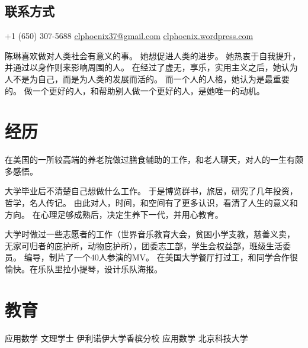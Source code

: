 \documentclass[]{friggeri-cv}
\begin{document}


\begin{aside} %
  \section{联系方式}
  +1 (650) 307-5688
  \href{mailto:clphoenix37+cv@gmail.com}{clphoenix37@gmail.com}
  \href{https://clphoenix.wordpress.com/}{clphoenix.wordpress.com}
\end{aside}

陈琳喜欢做对人类社会有意义的事。
她想促进人类的进步。
她热衷于自我提升，并通过以身作则来影响周围的人。
在经过了虚无，享乐，实用主义之后，她认为人不是为自己，而是为人类的发展而活的。
而一个人的人格，她认为是最重要的。
做一个更好的人，和帮助别人做一个更好的人，是她唯一的动机。


\section{经历}
在美国的一所较高端的养老院做过膳食辅助的工作，和老人聊天，对人的一生有颇多感悟。

大学毕业后不清楚自己想做什么工作。
于是博览群书，旅居，研究了几年投资，哲学，名人传记。
由此对人，时间，和空间有了更多认识，看清了人生的意义和方向。
在心理足够成熟后，决定生养下一代，并用心教育。

大学时做过一些志愿者的工作（世界音乐教育大会，贫困小学支教，慈善义卖，
无家可归者的庇护所，动物庇护所），团委志工部，学生会权益部，班级生活委员。
编导，制片了一个40人参演的MV。
在美国大学餐厅打过工，和同学合作很愉快。在乐队里拉小提琴，设计乐队海报。


\section{教育}

\begin{entrylist}
  {应用数学 文理学士}
  {伊利诺伊大学香槟分校}
  {}
  {应用数学}
  {北京科技大学}
  {}
\end{entrylist}
\end{document}
